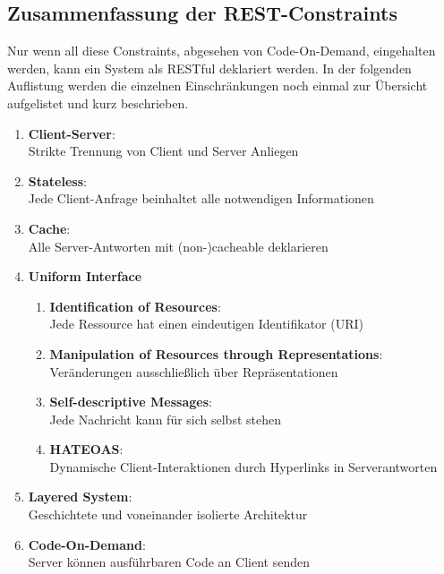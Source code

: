 \documentclass[draft,final]{vutinfth} %
\begin{document}
\subsection{Zusammenfassung der REST-Constraints}

Nur wenn all diese Constraints, abgesehen von Code-On-Demand, eingehalten werden, kann ein System als RESTful deklariert werden. 
In der folgenden Auflistung werden die einzelnen Einschränkungen noch einmal zur Übersicht aufgelistet und kurz beschrieben.

\begin{enumerate}
	\item \textbf{Client-Server}:   \\  Strikte Trennung von Client und Server Anliegen
	\item \textbf{Stateless}:       \\  Jede Client-Anfrage beinhaltet alle notwendigen Informationen
	\item \textbf{Cache}:           \\  Alle Server-Antworten mit (non-)cacheable deklarieren
	
	\item \textbf{Uniform Interface} 
	\begin{enumerate}[label*=\arabic*.]
		\item \textbf{Identification of Resources}: 					  \\ Jede Ressource hat einen eindeutigen Identifikator (URI)
		\item \textbf{Manipulation of Resources through Representations}: \\ Veränderungen ausschließlich über Repräsentationen
		\item \textbf{Self-descriptive Messages}: 						  \\ Jede Nachricht kann für sich selbst stehen
		\item \textbf{HATEOAS}: 										  \\ Dynamische Client-Interaktionen durch Hyperlinks in Serverantworten
	\end{enumerate}
	
	\item \textbf{Layered System}:  \\ Geschichtete und voneinander isolierte Architektur
	\item \textbf{Code-On-Demand}:  \\ Server können ausführbaren Code an Client senden
\end{enumerate}
\end{document}
